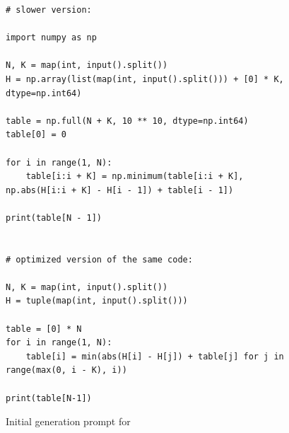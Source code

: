 \begin{figure}
    \begin{verbatim}
# slower version:

import numpy as np

N, K = map(int, input().split())
H = np.array(list(map(int, input().split())) + [0] * K, dtype=np.int64)

table = np.full(N + K, 10 ** 10, dtype=np.int64)
table[0] = 0

for i in range(1, N):
    table[i:i + K] = np.minimum(table[i:i + K], np.abs(H[i:i + K] - H[i - 1]) + table[i - 1])

print(table[N - 1])


# optimized version of the same code:

N, K = map(int, input().split())
H = tuple(map(int, input().split()))

table = [0] * N
for i in range(1, N):
    table[i] = min(abs(H[i] - H[j]) + table[j] for j in range(max(0, i - K), i))

print(table[N-1])

\end{verbatim}
\caption{Initial generation prompt for \codeopt}
\label{fig:prompt:pie:init}
\end{figure}